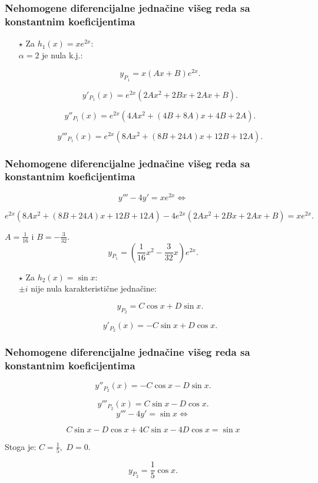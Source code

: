\documentclass{beamer}
\begin{document}
\begin{frame}
\frametitle{Nehomogene diferencijalne jednačine višeg reda sa konstantnim koeficijentima}



\begin{enumerate}
\item[$\star$] Za $h_{1}(x) = xe^{2x}$:\\

$\alpha = 2$ je nula k.j.:

$$y_{P_{1}} = x(Ax + B)e^{2x}.$$

$$y'_{P_{1}}(x) = e^{2x}(2Ax^{2}+ 2Bx + 2Ax +B) .$$ 

$$y''_{P_{1}}(x) = e^{2x}(4Ax^{2}+(4B+8A)x+4B+2A) .$$ 

$$y'''_{P_{1}}(x) =e^{2x} (8Ax^{2}+(8B+24A)x+12B+12A) .$$ 

\end{enumerate}
\end{frame}
\begin{frame}
\frametitle{Nehomogene diferencijalne jednačine višeg reda sa konstantnim koeficijentima}
$$y''' - 4y' = xe^{2x} \Longleftrightarrow$$

$$e^{2x} (8Ax^{2}+(8B+24A)x+12B+12A) - 4e^{2x}(2Ax^{2}+ 2Bx + 2Ax +B) = xe^{2x}.$$

$A = \frac{1}{16}$ i $B =- \frac{3}{32}.$\\

$$y_{P_{1}} = \left(\frac{1}{16}x^{2} -\frac{3}{32}x \right)e^{2x}.$$

\begin{enumerate}
    \item [$\star$] Za $ h_{2}(x) =\sin{x}:$\\
    
    $\pm i$ nije nula karakteristične jednačine:
    
$$y_{P_{2}} = C \cos{x} + D \sin{x}.$$

$$y'_{P_{2}}(x) = -C \sin{x}+ D \cos{x} .$$ 
\end{enumerate}
\end{frame}
\begin{frame}
\frametitle{Nehomogene diferencijalne jednačine višeg reda sa konstantnim koeficijentima}

$$y''_{P_{2}}(x) = -C \cos{x} -D \sin{x}  .$$ 

$$y'''_{P_{2}}(x) = C \sin{x} - D \cos{x} .$$ 
$$y''' - 4y' =  \sin{x}\Longleftrightarrow$$

$$C \sin{x} - D \cos{x} + 4C \sin{x} -  4D \cos{x} = \sin{x}$$

Stoga je: $C = \frac{1}{5}, $ $D = 0. $


$$y_{P_{2}} = \frac{1}{5} \cos{x}.$$

\end{frame}
\end{document}
